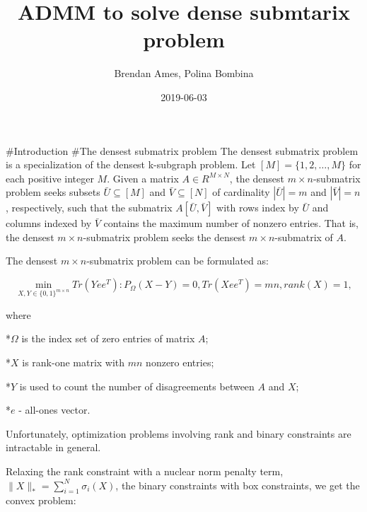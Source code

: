 \documentclass[]{article}
\title{ADMM to solve dense submtarix problem}
\author{Brendan Ames, Polina Bombina}
\date{2019-06-03}
\begin{document}
\maketitle

\newcommand{\tr}{{Tr}}
\newcommand{\rank}{{rank}}
\newcommand{\st}{{s.t.}}
\newcommand{\bs}{\boldsymbol}
\renewcommand{\a}{\bs{a}}
\renewcommand{\b}{\bs{b}}
\renewcommand{\d}{\bs{d}}
\newcommand{\e}{\bs{e}}
\newcommand{\I}{\bs{I}}
\newcommand{\m}{\bs{m}}
\newcommand{\n}{\bs{n}}
\newcommand{\s}{\bs{s}}
\renewcommand{\v}{\bs{v}}
\newcommand{\w}{\bs{w}}
\newcommand{\W}{\bs{W}}
\newcommand{\x}{\bs{x}}
\newcommand{\X}{\bs{X}}
\newcommand{\y}{\bs{y}}
\newcommand{\Y}{\bs{Y}}
\newcommand{\z}{\bs{z}}

\newcommand{\id}{\bs{1}}
\newcommand{\0}{\bs{0}}

\#Introduction \#The densest submatrix problem The densest submatrix
problem is a specialization of the densest k-subgraph problem. Let
\([M] = \{1,2,\dots, M\}\) for each positive integer \(M\). Given a
matrix \(A \in R^{M\times N}\), the densest \(m\times n\)-submatrix
problem seeks subsets \(\bar U \subseteq {[M]}\) and
\(\bar V \subseteq {[N]}\) of cardinality \(|\bar U|=m\) and
\(|\bar V| = n\), respectively, such that the submatrix
\(A{[\bar U, \bar V]}\) with rows index by \(\bar U\) and columns
indexed by \(\bar V\) contains the maximum number of nonzero entries.
That is, the densest \(m\times n\)-submatrix problem seeks the densest
\(m\times n\)-submatrix of \(A\).

The densest \(m\times n\)-submatrix problem can be formulated as:

\[\begin{equation}
    \min_{X, Y \in { \{0,1\}}^{m\times n} } {{Tr}(Yee^T): P_{\Omega}(X-Y) = 0, {Tr}(X ee^T) = mn, {rank}(X) = 1 },
\end{equation}\]

where

*\(\Omega\) is the index set of zero entries of matrix \(A\);

*\(X\) is rank-one matrix with \(mn\) nonzero entries;

*\(Y\) is used to count the number of disagreements between \(A\) and
\(X\);

*\(e\) - all-ones vector.

Unfortunately, optimization problems involving rank and binary
constraints are intractable in general.

Relaxing the rank constraint with a nuclear norm penalty term,
\(\|X \|_* = \sum_{i=1}^N \sigma_i(X)\), the binary constraints with box
constraints, we get the convex problem:
\end{document}
